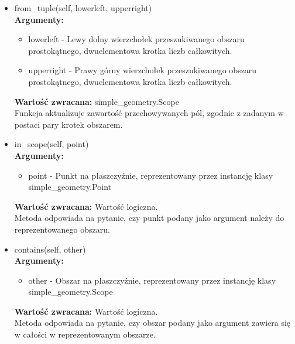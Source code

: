 \documentclass{article}
\begin{document}
\begin{itemize}
                    \item from\_tuple(self, lowerleft, upperright)\\
                        \textbf{Argumenty:} \begin{itemize}
                                \item lowerleft - Lewy dolny wierzchołek przeszukiwanego obszaru prostokątnego, dwuelementowa krotka liczb
                                całkowitych. 
                                \item upperright - Prawy górny wierzchołek przeszukiwanego obszaru prostokątnego, dwuelementowa krotka liczb całkowitych. 
                            \end{itemize}
                        \textbf{Wartość zwracana:} simple\_geometry.Scope\\
                        Funkcja aktualizuje zawartość przechowywanych pól, zgodnie z zadanym w postaci pary krotek obszarem.
                    
                    \item in\_scope(self, point)\\
                        \textbf{Argumenty:} \begin{itemize}
                                \item point - Punkt na płaszczyźnie, reprezentowany przez instancję klasy simple\_geometry.Point
                            \end{itemize}
                        \textbf{Wartość zwracana:} Wartość logiczna. \\
                        Metoda odpowiada na pytanie, czy punkt podany jako argument należy do reprezentowanego obszaru. 

                    
                    \item contains(self, other)\\
                        \textbf{Argumenty:} \begin{itemize}
                                \item other - Obszar na płaszczyźnie, reprezentowany przez instancję klasy simple\_geometry.Scope
                            \end{itemize}
                        \textbf{Wartość zwracana:} Wartość logiczna. \\
                        Metoda odpowiada na pytanie, czy obszar  podany jako argument zawiera się w całości w reprezentowanym obszarze. 
                    

\end{itemize}
\end{document}
